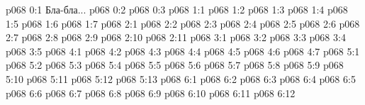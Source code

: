 \author{Мелхиседек}
\vs p068 0:1  Бла-бла...
\vs p068 0:2 
\vs p068 0:3 
\vs p068 1:1 
\vs p068 1:2 
\vs p068 1:3 
\vs p068 1:4 \pc 
\vs p068 1:5 
\vs p068 1:6 \pc 
\vs p068 1:7 
\vs p068 2:1 
\vs p068 2:2 
\vs p068 2:3 
\vs p068 2:4 
\vs p068 2:5 \pc 
\vs p068 2:6 
\vs p068 2:7 
\vs p068 2:8 
\vs p068 2:9 
\vs p068 2:10 \pc 
\vs p068 2:11 
\vs p068 3:1 
\vs p068 3:2 
\vs p068 3:3 
\vs p068 3:4 \pc 
\vs p068 3:5 
\vs p068 4:1 
\vs p068 4:2 
\vs p068 4:3 \pc 
\vs p068 4:4 
\vs p068 4:5 
\vs p068 4:6 
\vs p068 4:7 
\vs p068 5:1 
\vs p068 5:2 
\vs p068 5:3 
\vs p068 5:4 
\vs p068 5:5 
\vs p068 5:6 
\vs p068 5:7 
\vs p068 5:8 
\vs p068 5:9 
\vs p068 5:10 
\vs p068 5:11 
\vs p068 5:12 \pc 
\vs p068 5:13 
\vs p068 6:1 
\vs p068 6:2 
\vs p068 6:3 \pc 
\vs p068 6:4 
\vs p068 6:5 \pc 
\vs p068 6:6 
\vs p068 6:7 
\vs p068 6:8 
\vs p068 6:9 
\vs p068 6:10 
\vs p068 6:11 \pc 
\vsetoff
\vs p068 6:12 
\quizlink
